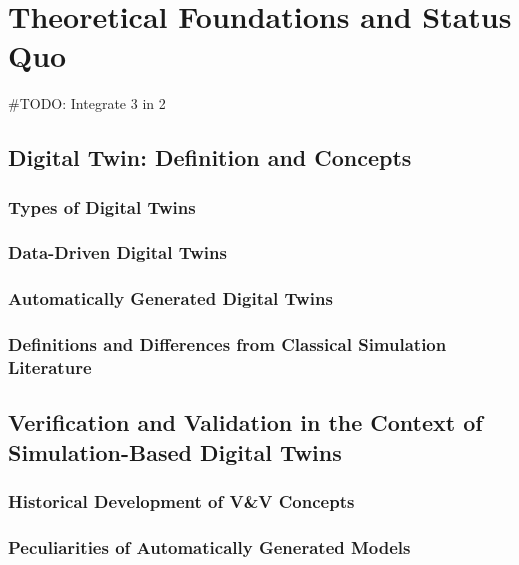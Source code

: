\chapter{Theoretical Foundations and Status Quo} #TODO: Integrate 3 in 2
\label{chap:theory}

\section{Digital Twin: Definition and Concepts}
\subsection{Types of Digital Twins}

\subsection{Data-Driven Digital Twins}

\subsection{Automatically Generated Digital Twins}
\subsection{Definitions and Differences from Classical Simulation Literature}

\section{Verification and Validation in the Context of Simulation-Based Digital Twins}


\subsection{Historical Development of V\&V Concepts}

\subsection{Peculiarities of Automatically Generated Models}

